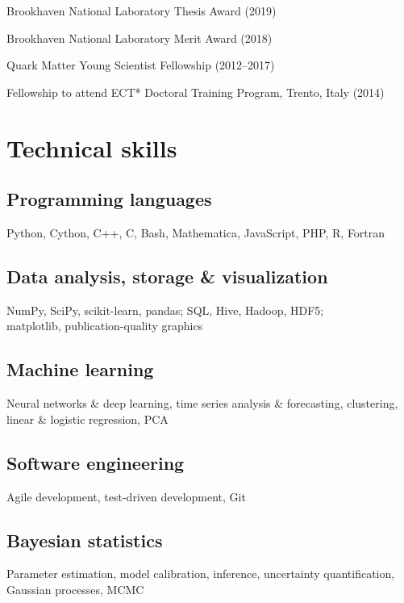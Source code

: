 \documentclass[letterpaper,10pt]{article}
\begin{document}
\begin{multicols}{2}
Brookhaven National Laboratory Thesis Award (2019)

Brookhaven National Laboratory Merit Award (2018)

Quark Matter Young Scientist Fellowship (2012--2017)

Fellowship to attend ECT* Doctoral Training Program, Trento, Italy (2014)



\columnbreak


\section{Technical skills}

\subsection{Programming languages}

Python, Cython, C++, C, Bash, Mathematica, JavaScript, PHP, R, Fortran

\subsection{Data analysis, storage \& visualization}

NumPy, SciPy, scikit-learn, pandas; SQL, Hive, Hadoop, HDF5; \\
matplotlib, publication-quality graphics

\subsection{Machine learning}

Neural networks \& deep learning, time series analysis \& forecasting, clustering, linear \& logistic regression, PCA

\subsection{Software engineering}

Agile development, test-driven development, Git

\subsection{Bayesian statistics}

Parameter estimation, model calibration, inference, uncertainty quantification, Gaussian processes, MCMC


\end{multicols}
\end{document}
